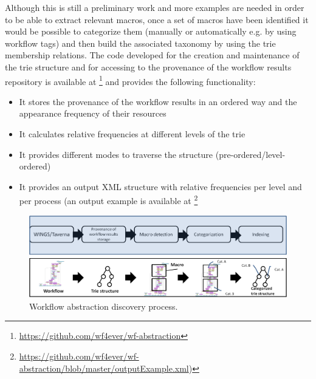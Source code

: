  
Although this is still a preliminary work and more examples are needed in order to be able to extract relevant macros, once a set of macros have been identified it would be possible to categorize them (manually or automatically e.g. by using workflow tags) and then build the associated taxonomy by using the trie membership relations. The code developed for the creation and maintenance of the trie structure and for accessing to the provenance of the workflow results repository is available at \footnote{\url{https://github.com/wf4ever/wf-abstraction}} and provides the following functionality:
\begin{itemize}
\item It stores the provenance of the workflow results in an ordered way and the appearance frequency of their resources
\item It calculates relative frequencies at different levels of the trie
\item It provides different modes to traverse the structure (pre-ordered/level-ordered)
\item It provides an output XML structure with relative frequencies per level and per process (an output example is available at \footnote{\url{https://github.com/wf4ever/wf-abstraction/blob/master/outputExample.xml})}
\end{itemize}









\begin{figure}
\begin{center}
	\includegraphics[scale=0.65]{./Figures/workflowAbstraction}
		\caption{Workflow abstraction discovery process.}
		\label{fig:workflowAbstraction}
\end{center}
\end{figure}
